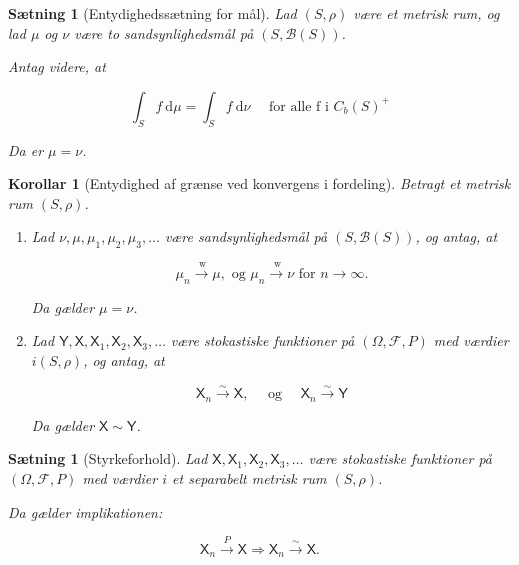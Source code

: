 \documentclass{article}
\newcommand{\1}{\mathbbm{1}}
\newcommand{\X}{\mathsf{X}}
\newcommand{\Y}{\mathsf{Y}}
\theoremstyle{boxed}
\newtheorem{corollary}[theorem]{Korollar}
\newtheorem{proposition}[theorem]{Sætning}
\begin{document}
\begin{theorem-box}
    \begin{proposition}[Entydighedssætning for mål]
        Lad $(S, \rho)$ være et metrisk rum, og lad $\mu$ og $\nu$ være to sandsynlighedsmål på $(S, \mathcal{B}(S))$.

Antag videre, at

$$
\int_S f \mathrm{~d} \mu=\int_S f \mathrm{~d} \nu \quad \text { for alle f i }  C_b(S)^{+}
$$


Da er $\mu=\nu$.
    \end{proposition}
\end{theorem-box}
\begin{theorem-box}
    \begin{corollary}[Entydighed af grænse ved konvergens i fordeling]
        Betragt et metrisk rum $(S, \rho)$.
        \begin{enumerate}
            \item Lad $\nu, \mu, \mu_1, \mu_2, \mu_3, \ldots$ være sandsynlighedsmål på $(S, \mathcal{B}(S))$, og antag, at

            $$
            \mu_n \xrightarrow{\mathrm{~w}} \mu, \text { og } \mu_n \xrightarrow{\mathrm{~w}} \nu \text { for } n \rightarrow \infty .
            $$
            
            
            Da gælder $\mu=\nu$.
            \item Lad $\mathsf{Y}, \mathsf{X}, \mathsf{X}_1, \mathsf{X}_2, \mathsf{X}_3, \ldots$ være stokastiske funktioner på $(\Omega, \mathcal{F}, P)$ med værdier $i(S, \rho)$, og antag, at

            $$
            \mathsf{X}_n \xrightarrow{\sim} \mathsf{X}, \quad \text { og } \quad \mathsf{X}_n \xrightarrow{\sim} \mathsf{Y}
            $$
            
            
            Da gælder $\X\sim\Y$.
        \end{enumerate}

    \end{corollary}
\end{theorem-box}
\begin{theorem-box}
    \begin{proposition}[Styrkeforhold]
        Lad $\X, \X_1, \X_2, \X_3, \ldots$ være stokastiske funktioner på $(\Omega, \mathcal{F}, P)$ med værdier $i$ et separabelt metrisk rum $(S, \rho)$.

Da gælder implikationen:

$$
\X_n \xrightarrow{P} \X \Longrightarrow \X_n \xrightarrow{\sim} \X .
$$

    \end{proposition}
\end{theorem-box}
\end{document}
